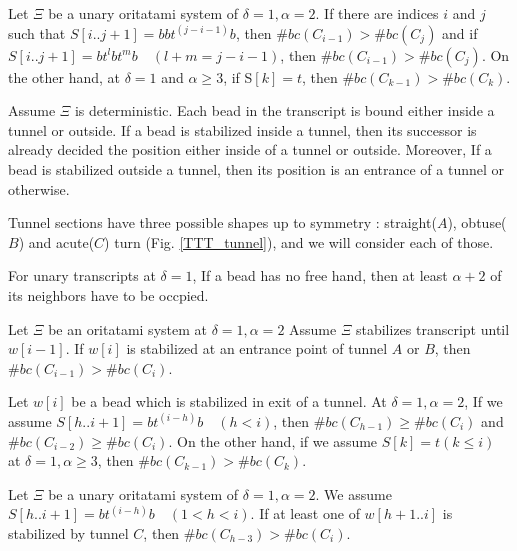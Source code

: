 \documentclass[runningheads]{llncs}
\begin{document}
\begin{theorem}
Let $\Xi$ be a unary oritatami system of $\delta = 1, \alpha = 2$. If there are indices $i$ and $j$ such that $S[i..j+1] = bbt^{(j-i-1)}b$, then $\#bc(C_{i-1}) > \#bc(C_j)$ and if $S[i..j+1] = bt^lbt^mb \quad (l + m = j-i-1)$, then $\#bc(C_{i-1}) > \#bc(C_j)$. On the other hand, at $\delta = 1$ and $\alpha \geq 3$, if S$[k] = t$, then $\#bc(C_{k-1}) > \#bc(C_k)$.
\end{theorem}



\proof%
Assume $\Xi$ is deterministic.
Each bead in the transcript is bound either inside a tunnel or outside. If a bead is stabilized inside a tunnel, then its successor is already decided the position either inside of a tunnel or outside. Moreover, If a bead is stabilized outside a tunnel, then its position is an entrance of a tunnel or otherwise.

Tunnel sections have three possible shapes up to symmetry : straight($A$), obtuse($B$) and acute($C$) turn (Fig. \ref{TTT_tunnel}), and we will consider each of those. 

\begin{lemma}
\label{TTT_neighbor_lemma}
For unary transcripts at $\delta = 1$, If a bead has no free hand, then at least $\alpha + 2$ of its neighbors have to be occpied.
\end{lemma}

\begin{lemma}
\label{TTT_entrance_Tab}
Let $\Xi$ be an oritatami system at $\delta = 1, \alpha =2$ 
Assume $\Xi$ stabilizes transcript until $w[i-1]$. If $w[i]$ is stabilized at an entrance point of tunnel $A$ or $B$, then $\#bc(C_{i-1}) > \#bc(C_{i})$.
\end{lemma}

\begin{lemma}
\label{TTT_exit}
Let $w[i]$ be a bead which is stabilized in exit of a tunnel.
At $\delta = 1, \alpha =2$, If we assume $S[h..i+1] = bt^{(i-h)}b \quad (h<i)$, then $\#bc(C_{h-1}) \geq \#bc(C_i)$ and $\#bc(C_{i-2}) \geq \#bc(C_i)$.
On the other hand, if we assume $S[k] = t (k \leq i)$ at $\delta =1, \alpha \geq 3$, then $\#bc(C_{k-1}) > \#bc(C_{k})$.
\end{lemma}

\begin{lemma}
\label{TTT_tunnelC_lemma}
Let $\Xi$ be a unary oritatami system of $\delta = 1, \alpha = 2$. We assume $S[h..i+1] = bt^{(i-h)}b \quad (1<h<i)$. If at least one of $w[h+1..i]$ is stabilized by tunnel $C$, then $\#bc(C_{h-3}) > \#bc(C_i)$.
\end{lemma}
\end{document}

